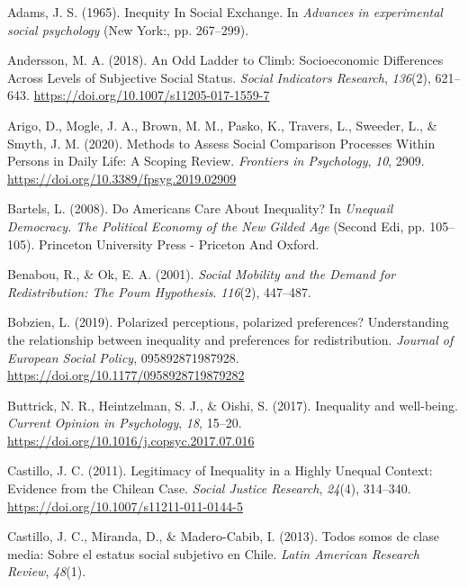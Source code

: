 \documentclass[
  12pt,
]{book}
\newlength{\cslhangindent}
\newlength{\cslentryspacingunit} %
\newenvironment{CSLReferences}[2] %
 {%
  \setlength{\parindent}{0pt}
  \ifodd #1
  \let\oldpar\par
  \def\par{\hangindent=\cslhangindent\oldpar}
  \fi
  \setlength{\parskip}{#2\cslentryspacingunit}
 }%
 {}
\begin{document}
\hypertarget{refs}{}
\begin{CSLReferences}{1}{0}
\leavevmode{}%
Adams, J. S. (1965). Inequity {In Social Exchange}. In \emph{Advances in experimental social psychology} (New York:, pp. 267--299).

\leavevmode{}%
Andersson, M. A. (2018). An {Odd Ladder} to {Climb}: {Socioeconomic Differences Across Levels} of {Subjective Social Status}. \emph{Social Indicators Research}, \emph{136}(2), 621--643. \url{https://doi.org/10.1007/s11205-017-1559-7}

\leavevmode{}%
Arigo, D., Mogle, J. A., Brown, M. M., Pasko, K., Travers, L., Sweeder, L., \& Smyth, J. M. (2020). Methods to {Assess Social Comparison Processes Within Persons} in {Daily Life}: {A Scoping Review}. \emph{Frontiers in Psychology}, \emph{10}, 2909. \url{https://doi.org/10.3389/fpsyg.2019.02909}

\leavevmode{}%
Bartels, L. (2008). Do {Americans Care About Inequality}? In \emph{Unequail {Democracy}. {The Political Economy} of the {New Gilded Age}} (Second Edi, pp. 105--105). {Princeton University Press - Priceton And Oxford}.

\leavevmode{}%
Benabou, R., \& Ok, E. A. (2001). \emph{Social {Mobility} and the {Demand} for {Redistribution}: {The Poum Hypothesis}}. \emph{116}(2), 447--487.

\leavevmode{}%
Bobzien, L. (2019). Polarized perceptions, polarized preferences? {Understanding} the relationship between inequality and preferences for redistribution. \emph{Journal of European Social Policy}, 095892871987928. \url{https://doi.org/10.1177/0958928719879282}

\leavevmode{}%
Buttrick, N. R., Heintzelman, S. J., \& Oishi, S. (2017). Inequality and well-being. \emph{Current Opinion in Psychology}, \emph{18}, 15--20. \url{https://doi.org/10.1016/j.copsyc.2017.07.016}

\leavevmode{}%
Castillo, J. C. (2011). Legitimacy of {Inequality} in a {Highly Unequal Context}: {Evidence} from the {Chilean Case}. \emph{Social Justice Research}, \emph{24}(4), 314--340. \url{https://doi.org/10.1007/s11211-011-0144-5}

\leavevmode{}%
Castillo, J. C., Miranda, D., \& Madero-Cabib, I. (2013). Todos somos de clase media: {Sobre} el estatus social subjetivo en {Chile}. \emph{Latin American Research Review}, \emph{48}(1).


\end{CSLReferences}
\end{document}
